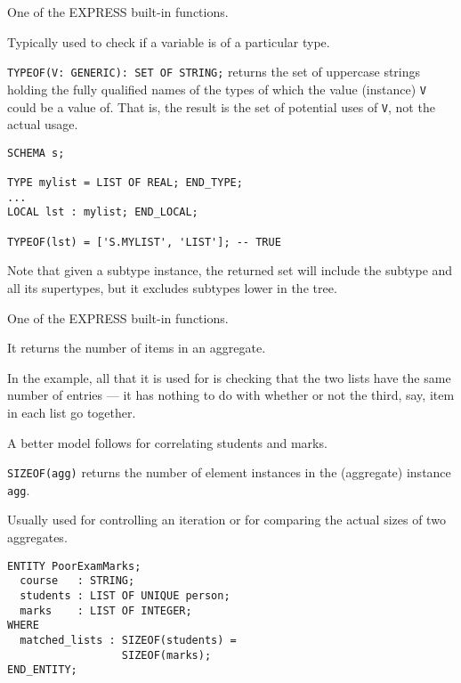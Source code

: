 \begin{remarks}
\remintro
{}

    One of the EXPRESS built-in functions.

    Typically used to check if a variable is of a particular type.

\remend
\end{remarks}


\verb|TYPEOF(V: GENERIC): SET OF STRING;| returns the set of uppercase
strings holding the fully qualified names of the types of which the
value (instance) \texttt{V} could be a value of. That is, the result is
the set of potential uses of \texttt{V}, not the actual usage.

\begin{verbatim}
SCHEMA s;

TYPE mylist = LIST OF REAL; END_TYPE;
...
LOCAL lst : mylist; END_LOCAL;

TYPEOF(lst) = ['S.MYLIST', 'LIST']; -- TRUE
\end{verbatim}
Note that given a subtype instance, the returned set will include the
subtype and all its supertypes, but it excludes subtypes lower in the tree.


\begin{remarks}
\remintro
{}

    One of the EXPRESS built-in functions.

    It returns the number of items in an aggregate.

    In the example, all that it is used for is checking that the
two lists have the same number of entries --- it has nothing to do with
whether or not the third, say, item in each list go together.

    A better model follows for correlating students and marks.

\remend
\end{remarks}


   \verb|SIZEOF(agg)| returns the number of element instances in 
the (aggregate) instance \verb|agg|.

    Usually used for controlling an iteration or for comparing the actual
sizes of two aggregates.


\begin{verbatim}
ENTITY PoorExamMarks;
  course   : STRING;
  students : LIST OF UNIQUE person;
  marks    : LIST OF INTEGER;
WHERE
  matched_lists : SIZEOF(students) = 
                  SIZEOF(marks);
END_ENTITY;
\end{verbatim}

